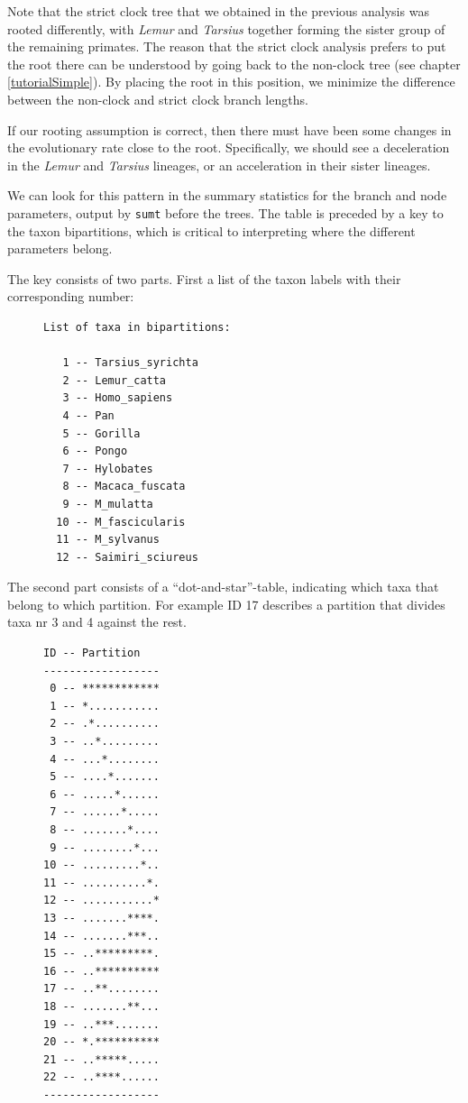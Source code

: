\documentclass[12pt]{book}
\begin{document}
Note that the strict clock tree that we obtained in the previous analysis was rooted differently,
with \textit{Lemur} and \textit{Tarsius} together forming the sister group of the remaining
primates. The reason that the strict clock analysis prefers to put the root there can be
understood by going back to the non-clock tree (see chapter \ref{tutorialSimple}). By placing
the root in this position, we minimize the difference between the non-clock and strict clock
branch lengths.

If our rooting assumption is correct, then there must have been some changes in the evolutionary
rate close to the root. Specifically, we should see a deceleration in the \textit{Lemur} and
\textit{Tarsius} lineages, or an acceleration in their sister lineages.

We can look for this pattern in the summary statistics for the branch and node parameters, output
by \texttt{sumt} before the trees. The table is preceded by a key to the taxon bipartitions,
which is critical to interpreting where the different parameters belong.

The key consists of two parts. First a list of the taxon labels with their corresponding number:

\begin{figure}[h]
\centering
\begin{BVerbatim}
List of taxa in bipartitions:                                                 
                                                                                
   1 -- Tarsius_syrichta
   2 -- Lemur_catta
   3 -- Homo_sapiens
   4 -- Pan
   5 -- Gorilla
   6 -- Pongo
   7 -- Hylobates
   8 -- Macaca_fuscata
   9 -- M_mulatta
  10 -- M_fascicularis
  11 -- M_sylvanus
  12 -- Saimiri_sciureus
\end{BVerbatim}
\end{figure}

The second part consists of a ``dot-and-star''-table, indicating which taxa that belong to which
partition. For example ID 17 describes a partition that divides taxa nr 3 and 4 against the rest.
\begin{figure}[H]
\centering
\begin{BVerbatim}
ID -- Partition
------------------
 0 -- ************
 1 -- *...........
 2 -- .*..........
 3 -- ..*.........
 4 -- ...*........
 5 -- ....*.......
 6 -- .....*......
 7 -- ......*.....
 8 -- .......*....
 9 -- ........*...
10 -- .........*..
11 -- ..........*.
12 -- ...........*
13 -- .......****.
14 -- .......***..
15 -- ..*********.
16 -- ..**********
17 -- ..**........
18 -- .......**...
19 -- ..***.......
20 -- *.**********
21 -- ..*****.....
22 -- ..****......
------------------
\end{BVerbatim}
\end{figure}
\end{document}
